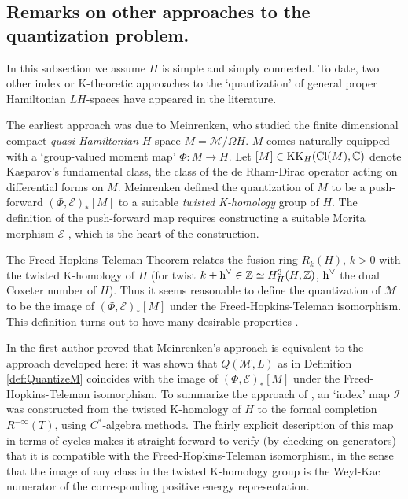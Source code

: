 \documentclass[11pt,reqno]{amsart}
\theoremstyle{definition}
\theoremstyle{remark}
\newcommand{\scr}[1]{\mathscr{#1}}
\def\hvee{\ensuremath{\textnormal{h}^\vee}}
\def\E{\ensuremath{\mathcal{E}}}
\def\M{\ensuremath{\mathcal{M}}}
\def\bC{\ensuremath{\mathbb{C}}}
\def\bZ{\ensuremath{\mathbb{Z}}}
\def\Cl{\ensuremath{\textnormal{Cl}}}
\def\KK{\ensuremath{\textnormal{KK}}}
\begin{document}
\subsection{Remarks on other approaches to the quantization problem.}\label{ssec:OtherApproaches}
In this subsection we assume $H$ is simple and simply connected.  To date, two other index or K-theoretic approaches to the `quantization' of general proper Hamiltonian $LH$-spaces have appeared in the literature. 

The earliest approach was due to Meinrenken, who studied the finite dimensional compact \emph{quasi-Hamiltonian} $H$-space $M=\M/\Omega H$.  $M$ comes naturally equipped with a `group-valued moment map' $\Phi \colon M \rightarrow H$.  Let $[M] \in \KK_H(\Cl(M),\bC)$ denote Kasparov's fundamental class, the class of the de Rham-Dirac operator acting on differential forms on $M$.  Meinrenken \cite{MeinrenkenKHomology} defined the quantization of $M$ to be a push-forward $(\Phi,\E)_\ast[M]$ to a suitable \emph{twisted K-homology} group of $H$.  The definition of the push-forward map requires constructing a suitable Morita morphism $\E$ \cite{DDDFunctor,MeinrenkenKHomology}, which is the heart of the construction.  

The Freed-Hopkins-Teleman Theorem relates the fusion ring $R_k(H)$, $k>0$ with the twisted K-homology of $H$ (for twist $k+\hvee \in \bZ \simeq H^3_H(H,\bZ)$, $\hvee$ the dual Coxeter number of $H$).  Thus it seems reasonable to define the quantization of $\M$ to be the image of $(\Phi,\E)_\ast[M]$ under the Freed-Hopkins-Teleman isomorphism.  This definition turns out to have many desirable properties \cite{MeinrenkenKHomology}.

In \cite{LoizidesGeomKHom} the first author proved that Meinrenken's approach is equivalent to the approach developed here: it was shown that $Q(\M,L)$ as in Definition \ref{def:QuantizeM} coincides with the image of $(\Phi,\E)_\ast[M]$ under the Freed-Hopkins-Teleman isomorphism.  To summarize the approach of \cite{LoizidesGeomKHom}, an `index' map $\scr{I}$ was constructed from the twisted K-homology of $H$ to the formal completion $R^{-\infty}(T)$, using $C^\ast$-algebra methods.  The fairly explicit description of this map in terms of cycles makes it straight-forward to verify (by checking on generators) that it is compatible with the Freed-Hopkins-Teleman isomorphism, in the sense that the image of any class in the twisted K-homology group is the Weyl-Kac numerator of the corresponding positive energy representation.  
\end{document}
